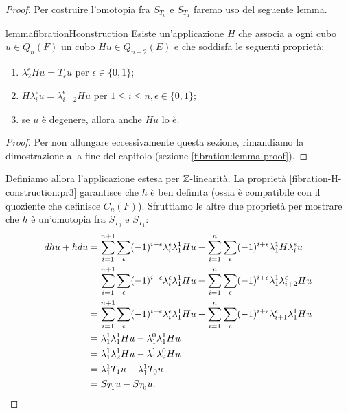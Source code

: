 \begin{proof}
Per costruire l'omotopia fra $S_{T_0}$ e $S_{T_1}$ faremo uso del seguente lemma.
\begin{restatable}{lemma}{fibrationHconstruction}\label{fibration-H-construction}
Esiste un'applicazione $H$ che associa a ogni cubo $u\in Q_n(F)$ un cubo $Hu\in Q_{n+2}(E)$ e che soddisfa le seguenti proprietà:
\begin{enumerate}
\item\label{fibration-H-construction:pr1} $\lambda^\epsilon_2Hu=T_\epsilon u$ per $\epsilon\in\{0,1\}$;
\item\label{fibration-H-construction:pr2} $H\lambda^\epsilon_iu=\lambda^\epsilon_{i+2}Hu$ per $1\le i\le n,\epsilon\in\{0,1\}$;
\item\label{fibration-H-construction:pr3} se $u$ è degenere, allora anche $Hu$ lo è.
\end{enumerate}
\end{restatable}
\begin{proof}
Per non allungare eccessivamente questa sezione, rimandiamo la dimostrazione alla fine del capitolo (sezione \ref{fibration:lemma-proof}).
\end{proof}
Definiamo allora l'applicazione
estesa per $\mathbb{Z}$-linearità. La proprietà \ref{fibration-H-construction:pr3} garantisce che $h$ è ben definita (ossia è compatibile con il quoziente che definisce $C_n(F)$). Sfruttiamo le altre due proprietà per mostrare che $h$ è un'omotopia fra $S_{T_0}$ e $S_{T_1}$:
\begin{align*}
dhu+hdu&=\sum_{i=1}^{n+1}\sum_\epsilon(-1)^{i+\epsilon}\lambda^\epsilon_i\lambda^1_1Hu+\sum_{i=1}^n\sum_\epsilon(-1)^{i+\epsilon}\lambda^1_1H\lambda^\epsilon_iu\\
&=\sum_{i=1}^{n+1}\sum_\epsilon(-1)^{i+\epsilon}\lambda^\epsilon_i\lambda^1_1Hu+\sum_{i=1}^n\sum_\epsilon(-1)^{i+\epsilon}\lambda^1_1\lambda^\epsilon_{i+2}Hu\\
&=\sum_{i=1}^{n+1}\sum_\epsilon(-1)^{i+\epsilon}\lambda^\epsilon_i\lambda^1_1Hu+\sum_{i=1}^n\sum_\epsilon(-1)^{i+\epsilon}\lambda^\epsilon_{i+1}\lambda^1_1Hu\\
&=\lambda^1_1\lambda^1_1Hu-\lambda^0_1\lambda^1_1Hu\\
&=\lambda^1_1\lambda^1_2Hu-\lambda^1_1\lambda^0_2Hu\\
&=\lambda^1_1T_1u-\lambda^1_1T_0u\\
&=S_{T_1}u-S_{T_0}u.\qedhere
\end{align*}
\end{proof}
